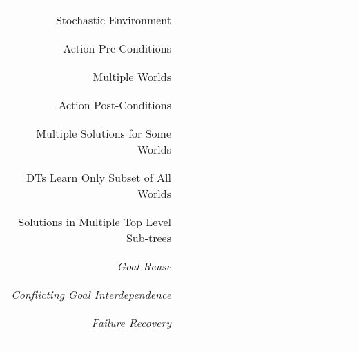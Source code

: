 \documentclass[landscape,a4paper,title page]{article}
\newcommand{\x}{{\checked}}
\begin{document}
\begin{table}[!htb]
\begin{tabular}{ r | c  c  c  c  c  c  c  c  c  c  c  c  c  c  c c }
  \\ \hline \\
  Stochastic Environment & \x & \x & \x & \x & \x & \x & \x & \x & \x & \x & \x & \x & \x & \x & \x \\
  \\ \hline \\
  Action Pre-Conditions & \x & \x & \x & \x & \x & \x & \x & \x & \x & \x & \x & \x & \x & \x & \x \\
  \\ \hline \\
  Multiple Worlds &   &   &   &   &   & \x & \x & \x & \x & \x & \x & \x & \x & \x & \x \\
  \\ \hline \\
  Action Post-Conditions &   &   &   &   &   & \x & \x & \x & \x & \x &   & \x & \x & \x & \x \\
  \\ \hline \\
  Multiple Solutions for Some Worlds &   &   &   &   &   & \x & \x & \x & \x & \x &   &   & \x & \x & \x \\
  \\ \hline \\
  DTs Learn Only Subset of All Worlds &   &   &   &   &   & \x & \x & \x & \x & \x &   &   & \x & \x & \x \\
  \\ \hline \\
  Solutions in Multiple Top Level Sub-trees &   &   &   &   &   &   &   &   &   &   &   & \x & \x & \x  & \x \\
  \\ \hline \\
  \textit{Goal Reuse} &   &   &   &   &   &   &   &   &   &   &   &   &   &   & \x \\
  \\ \hline \\
  \textit{Conflicting Goal Interdependence} &   &   &   &   &   &   &   &   &   &   &   &   &   &   &  \\
  \\ \hline \\
  \textit{Failure Recovery} &   &   &   &   &   &   &   &   &   &   &   &   &   &   &  \\
  \\ \hline \\ \\
  \end{tabular}
  \label{tab:perofrmanceFactors}
\end{table}
\end{document}
